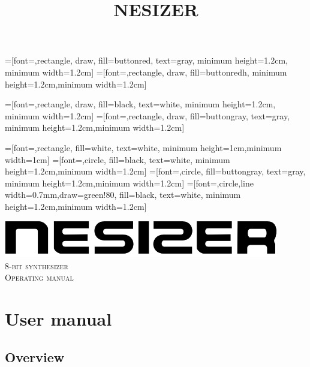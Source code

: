 \documentclass[a4paper, 12p, titlepaget]{book}
\title{NESIZER}
\author{}
\date{}
\begin{document}

=[font=\tiny,rectangle, draw, fill=buttonred, text=gray, minimum height=1.2cm, minimum width=1.2cm]
=[font=\tiny,rectangle, draw, fill=buttonredh, minimum height=1.2cm,minimum width=1.2cm]

=[font=\tiny,rectangle, draw, fill=black, text=white, minimum height=1.2cm, minimum width=1.2cm]
=[font=\tiny,rectangle, draw, fill=buttongray, text=gray, minimum height=1.2cm,minimum width=1.2cm]

=[font=\tiny,rectangle, fill=white, text=white, minimum height=1cm,minimum width=1cm]
=[font=\tiny,circle, fill=black, text=white, minimum height=1.2cm,minimum width=1.2cm]
=[font=\tiny,circle, fill=buttongray, text=gray, minimum height=1.2cm,minimum width=1.2cm]
=[font=\tiny,circle,line width=0.7mm,draw=green!80, fill=black, text=white, minimum height=1.2cm,minimum width=1.2cm]

\begin{titlepage}
  \begin{center}
    \vfil
    \includegraphics[width=12cm]{../nesizer_black.png}\\[3cm]

    \textsc{\LARGE{8-bit synthesizer}}\\[8cm]

    \textsc{\Large{Operating manual}}
  \end{center}
\end{titlepage}

\tableofcontents


\chapter{User manual}

\section{Overview}
\end{document}
